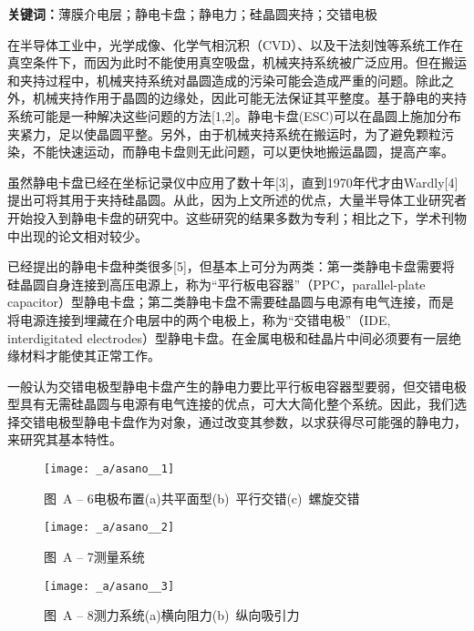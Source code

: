 \par\bigskip

\noindent \textbf{关键词：}薄膜介电层；静电卡盘；静电力；硅晶圆夹持；交错电极

\par\bigskip

在半导体工业中，光学成像、化学气相沉积（CVD）、以及干法刻蚀等系统工作在真空条件下，而因为此时不能使用真空吸盘，机械夹持系统被广泛应用。但在搬运和夹持过程中，机械夹持系统对晶圆造成的污染可能会造成严重的问题。除此之外，机械夹持作用于晶圆的边缘处，因此可能无法保证其平整度。基于静电的夹持系统可能是一种解决这些问题的方法[1,2]。静电卡盘(ESC)可以在晶圆上施加分布夹紧力，足以使晶圆平整。另外，由于机械夹持系统在搬运时，为了避免颗粒污染，不能快速运动，而静电卡盘则无此问题，可以更快地搬运晶圆，提高产率。

虽然静电卡盘已经在坐标记录仪中应用了数十年[3]，直到1970年代才由Wardly[4]提出可将其用于夹持硅晶圆。从此，因为上文所述的优点，大量半导体工业研究者开始投入到静电卡盘的研究中。这些研究的结果多数为专利；相比之下，学术刊物中出现的论文相对较少。

已经提出的静电卡盘种类很多[5]，但基本上可分为两类：第一类静电卡盘需要将硅晶圆自身连接到高压电源上，称为“平行板电容器”（PPC，parallel-plate capacitor）型静电卡盘；第二类静电卡盘不需要硅晶圆与电源有电气连接，而是将电源连接到埋藏在介电层中的两个电极上，称为“交错电极”（IDE, interdigitated electrodes）型静电卡盘。在金属电极和硅晶片中间必须要有一层绝缘材料才能使其正常工作。

一般认为交错电极型静电卡盘产生的静电力要比平行板电容器型要弱，但交错电极型具有无需硅晶圆与电源有电气连接的优点，可大大简化整个系统。因此，我们选择交错电极型静电卡盘作为对象，通过改变其参数，以求获得尽可能强的静电力，来研究其基本特性。

\begin{figure}[tbhp]
\centering
\texttt{[image: \_a/asano\_\_1]}
\caption*{图~A -- 6\hspace{1em}电极布置\quad (a)共平面型\quad (b)\ 平行交错\quad (c)\ 螺旋交错}
\end{figure}

\begin{figure}[tbhp]
\centering
\texttt{[image: \_a/asano\_\_2]}
\caption*{图~A -- 7\hspace{1em}测量系统}
\end{figure}

\begin{figure}[tbhp]
\centering
\texttt{[image: \_a/asano\_\_3]}
\caption*{图~A -- 8\hspace{1em}测力系统\quad (a)横向阻力\quad (b)\ 纵向吸引力}
\end{figure}


